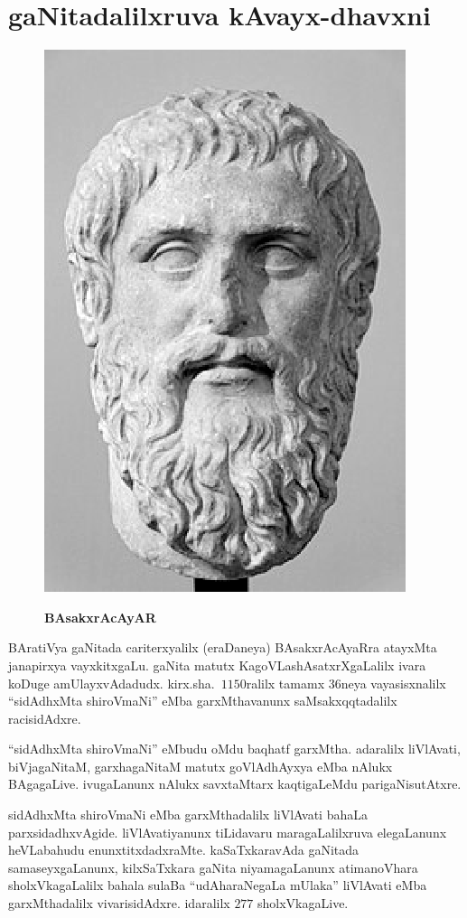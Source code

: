 \chapter{gaNitadalilxruva kAvayx-dhavxni}\label{chap13}

\begin{figure}
  \centering\includegraphics[scale=0.8]{src/figures/Plato.eps}
  
  {\bf BAsakxrAcAyAR}
    \end{figure}
    
BAratiVya gaNitada cariterxyalilx (eraDaneya) BAsakxrAcAyaRra atayxMta janapirxya vayxkitxgaLu. gaNita matutx KagoVLashAsatxrXgaLalilx ivara koDuge amUlayxvAdadudx. kirx.sha.\ $1150$ralilx tamamx $36$neya vayasisxnalilx ``sidAdhxMta shiroVmaNi'' eMba garxMthavanunx saMsakxqqtadalilx racisidAdxre.

``sidAdhxMta shiroVmaNi'' eMbudu oMdu baqhatf garxMtha. adaralilx liVlAvati, biVjagaNitaM, garxhagaNitaM matutx goVlAdhAyxya eMba nAlukx BAgagaLive. ivugaLanunx nAlukx savxtaMtarx kaqtigaLeMdu parigaNisutAtxre.

sidAdhxMta shiroVmaNi eMba garxMthadalilx liVlAvati bahaLa parxsidadhxvAgide. liVlAvatiyanunx tiLidavaru maragaLalilxruva elegaLanunx heVLabahudu enunxtitxdadxraMte. kaSaTxkaravAda gaNitada samaseyxgaLanunx, kilxSaTxkara gaNita niyamagaLanunx atimanoVhara sholxVkagaLalilx bahala sulaBa ``udAharaNegaLa mUlaka'' liVlAvati eMba garxMthadalilx vivarisidAdxre. idaralilx $277$ sholxVkagaLive.

